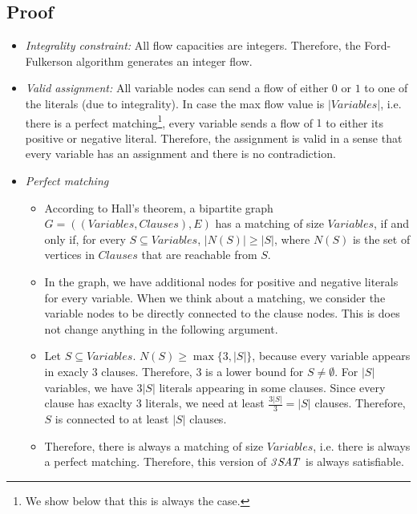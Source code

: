\documentclass[12pt]{article}
\begin{document}
\subsection*{Proof}
\begin{itemize}
	\item \emph{Integrality constraint:} All flow capacities are integers. Therefore, the Ford-Fulkerson algorithm generates an integer flow.
	\item \emph{Valid assignment:} All variable nodes can send a flow of either $0$ or $1$ to one of the literals (due to integrality). In case the max flow value is $|\mathit{Variables}|$, i.e. there is a perfect matching\footnote{We show below that this is always the case.}, every variable sends a flow of $1$ to either its positive or negative literal. Therefore, the assignment is valid in a sense that every variable has an assignment and there is no contradiction.
	\item \emph{Perfect matching}
	\begin{itemize}
		\item  According to Hall's theorem, a bipartite graph $G=((\mathit{Variables}, \mathit{Clauses}), E)$ has a matching of size $\mathit{Variables}$, if and only if, for every $S \subseteq \mathit{Variables}$, $|N(S)| \geq |S|$, where $N(S)$ is the set of vertices in $\mathit{Clauses}$ that are reachable from $S$.
		\item In the graph, we have additional nodes for positive and negative literals for every variable. When we think about a matching, we consider the variable nodes to be directly connected to the clause nodes. This is does not change anything in the following argument.
		\item Let $S \subseteq \mathit{Variables}$. $N(S) \geq \max \{3, |S|\}$, because every variable appears in exacly 3 clauses. Therefore, 3 is a lower bound for $S \not= \emptyset$. For $|S|$ variables, we have $3|S|$ literals appearing in some clauses. Since every clause has exaclty 3 literals, we need at least $\frac{3|S|}{3} = |S|$ clauses. Therefore, $S$ is connected to at least $|S|$ clauses.
	\item Therefore, there is always a matching of size $\mathit{Variables}$, i.e. there is always a perfect matching. Therefore, this version of $\mathit{3\-SAT}$ is always satisfiable.
	\end{itemize}
\end{itemize}
\end{document}
